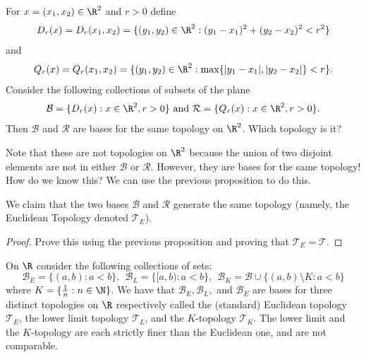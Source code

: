 \begin{eg}
   For \( x = ({x}_{1}, {x}_{2}) \in \R^{2} \) and \( r > 0  \) define 
   \[  {D}_{r}(x) = {D}_{r}({x}_{1}, {x}_{2}) = \{  ({y}_{1}, {y}_{2}) \in \R^{2} :  ({y}_{1} - {x}_{1})^{2} + ({y}_{2} - {x}_{2})^{2} < r^{2} \}\]
   and
   \[  {Q}_{r}(x) = {Q}_{r}({x}_{1}, {x}_{2}) = \{ ({y}_{1}, {y}_{2}) \in \R^{2} : \max \{  | {y}_{1} - {x}_{1} | , | {y}_{2} - {x}_{2} |  \} < r  \}.  \]
   Consider the following collections of subsets of the plane
   \[  \mathcal{B} = \{ {D}_{r}(x) : x \in \R^{2}, r > 0  \} \ \text{and} \ \mathcal{R} = \{  {Q}_{r}(x) : x \in \R^{2}, r > 0  \}.  \]
   Then \( \mathcal{B} \) and \( \mathcal{R} \) are bases for the same topology on \( \R^{2} \). Which topology is it?
\end{eg}

Note that these are not topologies on \( \R^{2} \) because the union of two disjoint elements are not in either \( \mathcal{B} \) or \( \mathcal{R} \). However, they are bases for the same topology! How do we know this? We can use the previous proposition to do this.

\begin{prop}
    We claim that the two bases \( \mathcal{B} \) and \( \mathcal{R} \) generate the same topology (namely, the Euclidean Topology denoted \( {\mathcal{T}}_{E} \)).
\end{prop}
\begin{proof}
Prove this using the previous proposition and proving that \( {\mathcal{T}}_{E} = \mathcal{T} \).
\end{proof}


\begin{eg}
    On \( \R  \) consider the following collections of sets:
    \[  \mathcal{B}_E = \{  (a,b) : a < b  \} , \ \ {\mathcal{B}}_{L} = \{  [a,b) : a < b  \} , \ \ {\mathcal{B}}_{K} = \mathcal{B} \cup \{ (a,b) \setminus  K  : a < b \}  \]
    where \( K = \{  \frac{ 1 }{ n }  : n \in \N  \}  \). We have that \( {\mathcal{B}}_{E }, {\mathcal{B}}_{L},  \) and \( {\mathcal{B}}_{E} \) are bases for three distinct topologies on \( \R  \) respectively called the (standard) Euclidean topology \( \mathcal{T}_E \), the lower limit topology \( {\mathcal{T}}_{L} \), and the \( K \)-topology \( \mathcal{T}_K \). The lower limit and the \( K \)-topology are each strictly finer than the Euclidean one, and are not comparable.
\end{eg}

